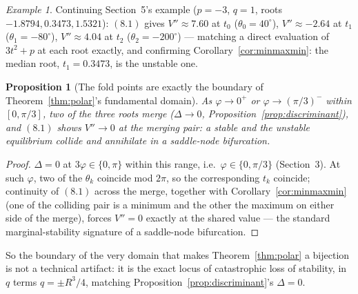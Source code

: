 \documentclass[11pt]{amsart}
\newtheorem{proposition}[theorem]{Proposition}
\theoremstyle{remark}
\newtheorem*{example}{Example}
\begin{document}
\begin{example}
Continuing Section~5's example ($p=-3$, $q=1$, roots $-1.8794,0.3473,1.5321$): $(8.1)$ gives $V''\approx7.60$ at $t_0$ ($\theta_0=40^\circ$), $V''\approx-2.64$ at $t_1$ ($\theta_1=-80^\circ$), $V''\approx4.04$ at $t_2$ ($\theta_2=-200^\circ$) --- matching a direct evaluation of $3t^2+p$ at each root exactly, and confirming Corollary~\ref{cor:minmaxmin}: the median root, $t_1=0.3473$, is the unstable one.
\end{example}

\begin{proposition}[The fold points are exactly the boundary of Theorem~\ref{thm:polar}'s fundamental domain]\label{prop:fold}
As $\varphi\to0^+$ or $\varphi\to(\pi/3)^-$ within $[0,\pi/3]$, two of the three roots merge ($\Delta\to0$, Proposition~\ref{prop:discriminant}), and $(8.1)$ shows $V''\to0$ at the merging pair: a stable and the unstable equilibrium collide and annihilate in a saddle-node bifurcation.
\end{proposition}

\begin{proof}
$\Delta=0$ at $3\varphi\in\{0,\pi\}$ within this range, i.e.\ $\varphi\in\{0,\pi/3\}$ (Section~3). At such $\varphi$, two of the $\theta_k$ coincide mod $2\pi$, so the corresponding $t_k$ coincide; continuity of $(8.1)$ across the merge, together with Corollary~\ref{cor:minmaxmin} (one of the colliding pair is a minimum and the other the maximum on either side of the merge), forces $V''=0$ exactly at the shared value --- the standard marginal-stability signature of a saddle-node bifurcation.
\end{proof}

So the boundary of the very domain that makes Theorem~\ref{thm:polar} a bijection is not a technical artifact: it is the exact locus of catastrophic loss of stability, in $q$ terms $q=\pm R^3/4$, matching Proposition~\ref{prop:discriminant}'s $\Delta=0$.
\end{document}
